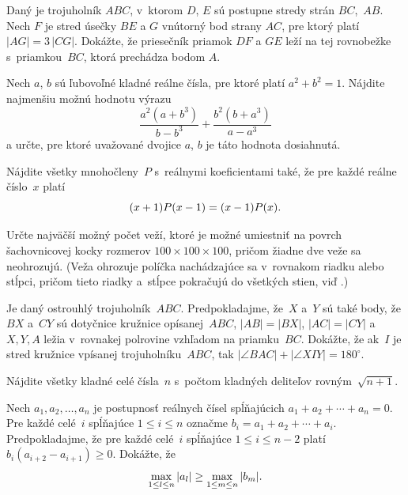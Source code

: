 {%
Daný je trojuholník $ABC$, v~ktorom $D$, $E$ sú postupne stredy
strán $BC$,~$AB$. Nech $F$ je stred úsečky $BE$
a $G$ vnútorný bod strany $AC$, pre ktorý platí $|AG|=3\,|CG|$.
Dokážte, že priesečník priamok $DF$ a $GE$ leží na tej rovnobežke
s~priamkou~$BC$, ktorá prechádza bodom $A$.
}

{%
Nech $a$, $b$ sú ľubovoľné kladné reálne čísla, pre ktoré platí $a^2+b^2=1$.
Nájdite najmenšiu možnú hodnotu výrazu
$$
\frac{a^2(a+b^3)}{b-b^3}+\frac{b^2(b+a^3)}{a-a^3}
$$
a určte, pre ktoré uvažované dvojice $a$, $b$ je táto hodnota dosiahnutá.}

{%

Nájdite všetky mnohočleny~$P$ s~reálnymi koeficientami také, že pre každé reálne číslo~$x$ platí
$$
(x+1)P(x-1) = (x-1)P(x).
\belowdisplayskip0pt
$$}

{%

Určte najväčší možný počet veží, ktoré je možné umiestniť na povrch šachovnicovej kocky rozmerov $100 \times 100 \times 100$, pričom žiadne dve veže sa neohrozujú. (Veža ohrozuje políčka nachádzajúce sa v~rovnakom riadku alebo stĺpci, pričom tieto riadky a~stĺpce pokračujú do všetkých stien, viď \obr.)
%
}

{%

Je daný ostrouhlý trojuholník~$ABC$. Predpokladajme, že~$X$ a~$Y$ sú také body, že $BX$ a~$CY$ sú dotyčnice kružnice opísanej~$ABC$, $|AB|=|BX|$, $|AC|=|CY|$ a~$X,Y,A$ ležia v~rovnakej polrovine vzhľadom na priamku~$BC$. Dokážte, že ak~$I$ je stred kružnice vpísanej trojuholníku~$ABC$, tak $|\angle BAC| + |\angle XIY| = 180^\circ$.
}

{%

Nájdite všetky kladné celé čísla~$n$ s~počtom kladných deliteľov rovným~$\sqrt{n+1}$.
}

{%

Nech $a_1,a_2,\ldots,a_n$ je postupnosť reálnych čísel spĺňajúcich $a_1+a_2+\cdots+a_n=0$. Pre každé celé~$i$ spĺňajúce $1 \leq i\leq n$ označme $b_i=a_1+a_2+\cdots+a_i$. Predpokladajme, že pre každé celé~$i$ spĺňajúce $1 \leq i \leq n-2$ platí $b_i(a_{i+2}-a_{i+1}) \ge 0$. Dokážte, že
$$
\max_{1 \leq l \leq n} |a_l| \ge
\max_{1 \leq m \leq n} |b_m|.
\belowdisplayskip0pt
$$
}

